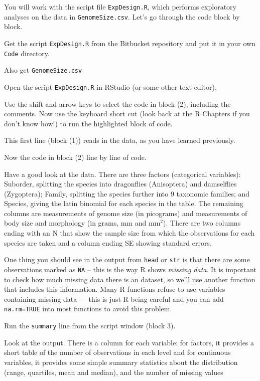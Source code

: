 You will work with the script file {\tt  ExpDesign.R}, which performs 
exploratory analyses on the data in {\tt GenomeSize.csv}. Let's go 
through the code block by block. 

\begin{compactitem}[$\quad\star$]
    \item Get the script {\tt ExpDesign.R} from the Bitbucket 
    repository and put it in your own {\tt Code} directory.
		\item Also get {\tt GenomeSize.csv}
		\item Open the script {\tt ExpDesign.R} in RStudio (or some other 
		text editor). 
		\item Use the shift and arrow keys to select the code in block (2), 
		including the comments. Now use the keyboard short cut (look back 
		at the R Chapters if you don't know how!) to run the highlighted block 
		of code.
\end{compactitem}

This first line (block (1)) reads in the data, as you have learned previously.
\begin{compactitem}[$\quad\star$]
    \item Now the code in block (2) line by line  
    of code.
\end{compactitem}
Have a good look at the data. There are three factors 
(categorical variables): Suborder, splitting the species into 
dragonflies (Anisoptera) and damselflies (Zygoptera); Family, splitting 
the species further into 9 taxonomic families; and Species, giving the 
latin binomial for each species in the table. The remaining columns are 
measurements of genome size (in picograms) and measurements of body 
size and morphology (in grams, mm and mm$^2$). There are two columns 
ending with an N that show the sample size from which the observations 
for each species are taken and a column ending SE showing standard 
errors.

One thing you should see in the output from {\tt head} or {\tt str} is 
that there are some observations marked as {\tt NA} -- this is the way R 
shows {\it missing data}. It is important to check how much missing 
data there is an dataset, so we'll use another function that includes 
this information. Many R functions refuse to use variables containing 
missing data --- this is just R being careful and you can add {\tt 
na.rm=TRUE} into most functions to avoid this problem.
 
\begin{compactitem}[$\quad\star$]
\item Run the {\tt summary} line from the script window (block 3). 
\end{compactitem}
Look at the output. There is a column for each variable: for 
factors, it provides a short table of the number of observations in 
each level and for continuous variables, it provides some simple 
summary statistics about the distribution (range,  quartiles, mean and 
median), and the number of missing values 

